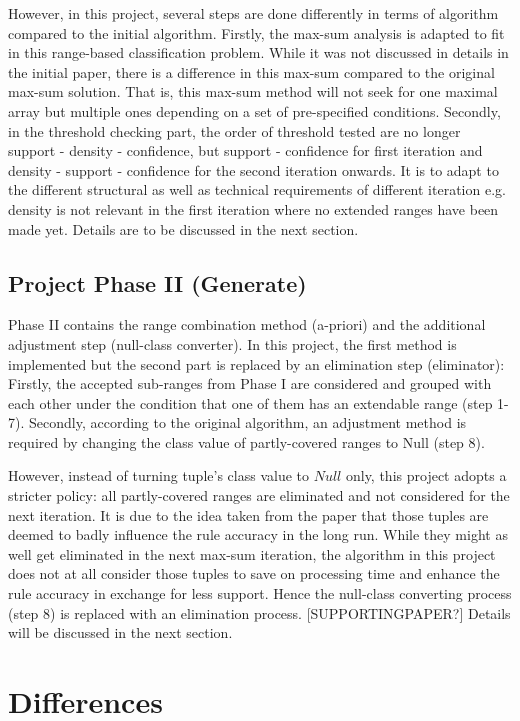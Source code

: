 However, in this project, several steps are done differently in terms of algorithm compared to the initial algorithm. Firstly, the max-sum analysis is adapted to fit in this range-based classification problem. While it was not discussed in details in the initial paper, there is a difference in this max-sum compared to the original max-sum solution. That is, this max-sum method will not seek for one maximal array but multiple ones depending on a set of pre-specified conditions. Secondly, in the threshold checking part, the order of threshold tested are no longer support - density - confidence, but support - confidence for first iteration and density - support - confidence for the second iteration onwards. It is to adapt to the different structural as well as technical requirements of different iteration e.g. density is not relevant in the first iteration where no extended ranges have been made yet. Details are to be discussed in the next section.

\subsection{Project Phase II (Generate)}

Phase II contains the range combination method (a-priori) and the additional adjustment step (null-class converter). In this project, the first method is implemented but the second part is replaced by an elimination step (eliminator): Firstly, the accepted sub-ranges from Phase I are considered and grouped with each other under the condition that one of them has an extendable range (step 1-7). Secondly, according to the original algorithm, an adjustment method is required by changing the class value of partly-covered ranges to Null (step 8). 

However, instead of turning tuple's class value to $Null$ only, this project adopts a stricter policy: all partly-covered ranges are eliminated and not considered for the next iteration. It is due to the idea taken from the paper that those tuples are deemed to badly influence the rule accuracy in the long run. While they might as well get eliminated in the next max-sum iteration, the algorithm in this project does not at all consider those tuples to save on processing time and enhance the rule accuracy in exchange for less support. Hence the null-class converting process (step 8) is replaced with an elimination process. [SUPPORTINGPAPER?] Details will be discussed in the next section.

\section{Differences}

